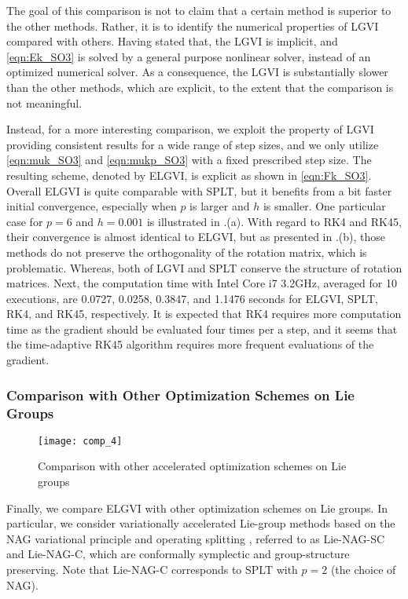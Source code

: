 \documentclass[letterpaper, 10pt, conference]{ieeeconf}
\begin{document}
The goal of this comparison is not to claim that a certain method is superior to the other methods.
Rather, it is to identify the numerical properties of LGVI compared with others. 
Having stated that, the LGVI is implicit, and \eqref{eqn:Ek_SO3} is solved by a general purpose nonlinear solver, instead of an optimized numerical solver. As a consequence, the LGVI is substantially slower than the other methods, which are explicit, to the extent that the comparison is not meaningful. 

Instead, for a more interesting comparison, we exploit the property of LGVI providing consistent results for a wide range of step sizes, and we only utilize \eqref{eqn:muk_SO3} and \eqref{eqn:mukp_SO3} with a fixed prescribed step size. 
The resulting scheme, denoted by ELGVI, is explicit as shown in \eqref{eqn:Fk_SO3}.
Overall ELGVI is quite comparable with SPLT, but it benefits from a bit faster initial convergence, especially when $p$ is larger and $h$ is smaller. 
One particular case for $p=6$ and $h=0.001$ is illustrated in .(a).
With regard to RK4 and RK45, their convergence is almost identical to ELGVI, but as presented in .(b), those methods do not preserve the orthogonality of the rotation matrix, which is problematic.  
Whereas, both of LGVI and SPLT conserve the structure of rotation matrices. 
Next, the computation time with Intel Core i7 3.2GHz, averaged for 10 executions, are 0.0727, 0.0258, 0.3847, and 1.1476 seconds for ELGVI, SPLT, RK4, and RK45, respectively. 
It is expected that RK4 requires more computation time as the gradient should be evaluated four times per a step, and it seems that the time-adaptive RK45 algorithm requires more frequent evaluations of the gradient. 

\subsubsection{Comparison with Other Optimization Schemes on Lie Groups}

\begin{figure}
    \centerline{
        \texttt{[image: comp\_4]}
    }
    \caption{Comparison with other accelerated optimization schemes on Lie groups}\label{fig:comp_accel}
\end{figure}

Finally, we compare ELGVI with other optimization schemes on Lie groups. 
In particular, we consider variationally accelerated Lie-group methods based on the NAG variational principle and operating splitting \cite{tao2020variational},  referred to as Lie-NAG-SC and Lie-NAG-C, which are conformally symplectic and group-structure preserving. Note that Lie-NAG-C corresponds to SPLT with $p=2$ (the choice of NAG).
\end{document}
